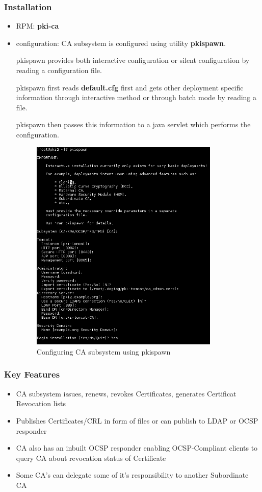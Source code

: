 \documentclass[a4paper]{article}
\begin{document}
\subsubsection{Installation}
    \begin{itemize}
        \item RPM: \textrm{\textbf{pki-ca}}
        \item configuration:  CA subsystem is configured using utility \textbf{pkispawn}. 
            
            pkispawn provides both interactive configuration  or silent configuration by reading a configuration file. 
            
            pkispawn first reads \textbf{default.cfg} first and gets other deployment specific information through interactive method
            or through batch mode by reading a file. 

            pkispawn then passes this information to a java servlet which performs the configuration. 
        \begin{figure}[ht!]
            \centering
            \includegraphics[width=90mm]{pkispawn-ca.png}
            \caption{Configuring CA subsystem using pkispawn}
        \end{figure}
    \end{itemize}
\subsubsection{Key Features}
    \begin{itemize}
        \item CA subsystem issues, renews, revokes Certificates, generates Certificat Revocation lists
        \item Publishes Certificates/CRL in form of files or can publish to LDAP or OCSP responder
        \item CA also has an inbuilt OCSP responder enabling OCSP-Compliant clients to query CA about revocation status of Certificate
        \item Some CA's can delegate some of it's responsibility to another Subordinate CA
    \end{itemize}
\end{document}
